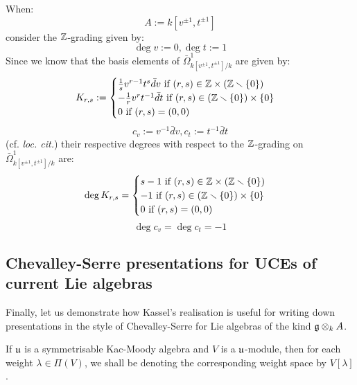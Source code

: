 \begin{remark}
            When:
                $$A := k[v^{\pm 1}, t^{\pm 1}]$$
            consider the $\mathbb{Z}$-grading given by:
                $$\deg v := 0, \deg t := 1$$
            Since we know that the basis elements of $\bar{\Omega}^1_{k[v^{\pm 1}, t^{\pm 1}]/k}$ are given by:
                $$
                    K_{r, s} :=
                    \begin{cases}
                        \text{$\frac1s v^{r - 1} t^s \bar{d}v$ if $(r, s) \in \Z \x (\Z \setminus \{0\})$}
                        \\
                        \text{$-\frac1r v^r t^{-1} \bar{d}t$ if $(r, s) \in (\Z \setminus \{0\}) \x \{0\}$}
                        \\
                        \text{$0$ if $(r, s) = (0, 0)$}
                    \end{cases}
                $$
                $$c_v := v^{-1} \bar{d}v, c_t := t^{-1} \bar{d}t$$
            (cf. \textit{loc. cit.}) their respective degrees with respect to the $\mathbb{Z}$-grading on $\bar{\Omega}^1_{k[v^{\pm 1}, t^{\pm 1}]/k}$ are:
                $$
                    \deg K_{r, s} =
                    \begin{cases}
                        \text{$s - 1$ if $(r, s) \in \Z \x (\Z \setminus \{0\})$}
                        \\
                        \text{$-1$ if $(r, s) \in (\Z \setminus \{0\}) \x \{0\}$}
                        \\
                        \text{$0$ if $(r, s) = (0, 0)$}
                    \end{cases}
                $$
                $$\deg c_v = \deg c_t = -1$$
        \end{remark}

    \subsection{Chevalley-Serre presentations for UCEs of current Lie algebras}
        Finally, let us demonstrate how Kassel's realisation is useful for writing down presentations in the style of Chevalley-Serre for Lie algebras of the kind $\g \tensor_k A$.

        \begin{convention}
            If $\mathfrak{u}$ is a symmetrisable Kac-Moody algebra and $V$ is a $\mathfrak{u}$-module, then for each weight $\lambda \in \Pi(V)$, we shall be denoting the corresponding weight space by $V[\lambda]$.
        \end{convention}


